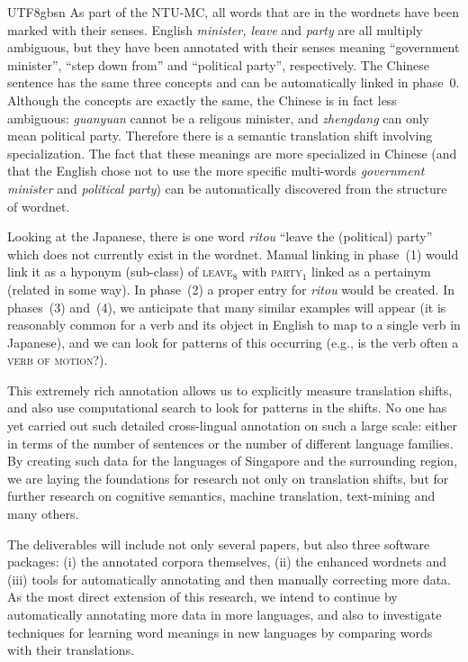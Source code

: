 \documentclass[12pt]{book} %
\newcommand{\eng}[1]{\textit{#1}}
\newcommand{\cmn}[1]{\textit{#1}}
\newcommand{\jpn}[1]{\textit{#1}}
\begin{document}
\begin{CJK}{UTF8}{gbsn}
As part of the NTU-MC, all words that are in the wordnets have been
marked with their senses.  English \eng{minister, leave} and
\eng{party} are all multiply ambiguous, but they have been annotated
with their senses meaning ``government minister'', ``step down from''
and ``political party'', respectively.  The Chinese sentence has the
same three concepts and can be automatically linked in phase~0.
Although the concepts are exactly the same, the Chinese is in fact
less ambiguous: \cmn{guanyuan} cannot be a religous minister, and
\cmn{zhengdang} can only mean political party.  Therefore there is a
semantic translation shift involving specialization.  The fact that
these meanings are more specialized in Chinese (and that the English
chose not to use the more specific multi-words \eng{government
  minister} and \eng{political party}) can be automatically discovered
from the structure of wordnet.

Looking at the Japanese, there is one word \jpn{ritou} ``leave the
(political) party'' which does not currently exist in the wordnet.
Manual linking in phase~(1) would link it as a hyponym (sub-class) of
\textsc{leave}$_8$ with \textsc{party}$_1$ linked as a pertainym
(related in some way).  In phase~(2) a proper entry for \jpn{ritou}
would be created.  In phases~(3) and~(4), we anticipate that many
similar examples will appear (it is reasonably common for a verb and
its object in English to map to a single verb in Japanese), and we can
look for patterns of this occurring (e.g., is the verb often a
\textsc{verb of motion}?).

This extremely rich annotation allows us to explicitly measure
translation shifts, and also use computational search to look for
patterns in the shifts.  No one has yet carried out such detailed
cross-lingual annotation on such a large scale: either in terms of the
number of sentences or the number of different language families.  By
creating such data for the languages of Singapore and the surrounding
region, we are laying the foundations for research not only on
translation shifts, but for further research on cognitive semantics,
machine translation, text-mining and many others.

The deliverables will include not only several papers, but also three
software packages: (i) the annotated corpora themselves, (ii) the
enhanced wordnets and (iii) tools for automatically annotating and
then manually correcting more data.  As the most direct extension of
this research, we intend to continue by automatically annotating more
data in more languages, and also to investigate techniques for
learning word meanings in new languages by comparing words with their
translations.


\end{CJK}
\end{document}
